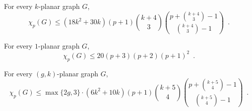 \documentclass{patmorin}
\renewcommand{\ge}{\geqslant}
\renewcommand{\le}{\leqslant}
\renewcommand{\leq}{\leqslant}
\newcommand{\treewidth}{\ensuremath{\binom{k+4}{3}}-1}
\begin{document}

\begin{cor}
\label{pck}
For every $k$-planar graph $G$, 
$$\chi_p(G)\le (18k^2+30k)(p+1) \binom{k+4}{3} \binom{p+ \binom{k+4}{3}-1}{ \binom{k+4}{3}-1}\enspace.$$
\end{cor}

\begin{cor}
\label{pc1}
For every $1$-planar graph $G$, 
$$\chi_p(G)\le 20 (p+3)(p+2)(p+1)^2\enspace.$$
\end{cor}

\begin{cor}
\label{pcgk}
For every $(g,k)$-planar graph $G$,  
$$\chi_p(G) \le \max\{2g,3\}\cdot(6k^2 + 10k) (p+1) \binom{k+5}{4}\binom{p+\binom{k+5}{4}-1}{\binom{k+5}{4}-1}\enspace.$$
\end{cor}

\end{document}
